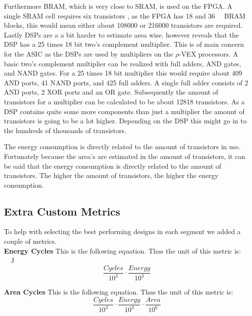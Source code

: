 Furthermore BRAM, which is very close to SRAM, is used on the FPGA.
A single SRAM cell requires six transistors \cite{Kumar Chakravarti}, as the FPGA has \num{18} and \SI{36}{\kibi\byte} BRAM blocks, this would mean either about \num{108000} or \num{216000} transistors are required. Lastly DSPs are a a bit harder to estimate area wise.
\cite{} however reveals that the DSP has a 25 times 18 bit two's complement multiplier.
This is of main concern for the ASIC as the DSPs are used by multipliers on the $\rho$-VEX processors.
A basic two's complement multiplier can be realized with full adders, AND gates, and NAND gates.
For a 25 times 18 bit multiplier this would require about \num{409} AND ports, 41 NAND ports, and 425 full adders.
A single full adder consists of \num{2} AND ports, \num{2} XOR ports and an OR gate.
Subsequently the amount of transistors for a multiplier can be calculated to be about \num{12818} transistors.
As a DSP contains quite some more components than just a multiplier the amount of transistors is going to be a lot higher.
Depending on the DSP this might go in to the hundreds of thousands of transistors.

The energy consumption is directly related to the amount of transistors in use.
Fortunately because the area's are estimated in the amount of transistors, it can be said that the energy consumption is directly related to the amount of transistors.
The higher the amount of transistors, the higher the energy consumption.


\subsection{Extra Custom Metrics}
\label{ssec:soc-design-extra-custom-metrics}
To help with selecting the best performing designs in each segment we added a couple of metrics.\\


\textbf{Energy Cycles}
This is the following equation. Thus the unit of this metric is: \si{\kilo\cycles\joule}
\begin{equation}
\frac{Cycles}{10^3} \cdot \frac{Energy}{10^3}
\end{equation}

\textbf{Area Cycles}
This is the following equation. Thus the unit of this metric is: \si{\kilo\cycles\giga\transistors}
\begin{equation}
\frac{Cycles}{10^3} \cdot \frac{Energy}{10^3} \cdot \frac{Area}{10^6}
\end{equation}

